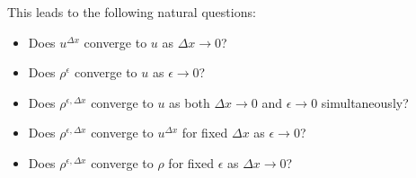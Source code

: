 This leads to the following natural questions:
\begin{itemize}
    \item Does $u^{\Delta x}$ converge to $u$ as $\Delta x \rightarrow 0$?
    \item Does $\rho^{\epsilon}$ converge to $u$ as $\epsilon \rightarrow 0$?
    \item Does $\rho^{\epsilon, \Delta x}$ converge to $u$ as both $\Delta x \rightarrow 0$ and $\epsilon \rightarrow 0$ simultaneously?
    \item Does $\rho^{\epsilon, \Delta x}$ converge to $u^{\Delta x}$ for fixed $\Delta x$ as $\epsilon \rightarrow 0$?
    \item Does $\rho^{\epsilon, \Delta x}$ converge to $\rho$ for fixed $\epsilon$ as  $\Delta x \rightarrow 0$?
\end{itemize}


